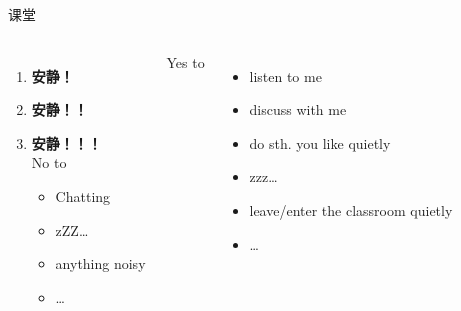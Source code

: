 \begin{frame}[<+->]{课堂}
	\linespread{1.2}
	\begin{columns}
		\begin{enumerate}
		  \item {\bf 安静！}
		  \item {\bf 安静！！}
		  \item {\bf 安静！！！}\\
		  \vspace{2em}
		  \pause
		  \alert{No to}
		  \begin{itemize}
		    \item Chatting
		    \item zZZ\ldots
		    \item anything noisy
		    \item \ldots
		  \end{itemize}
		\end{enumerate}
		\pause
		\alert{Yes to}
		  \begin{itemize}
		    \item listen to me
		    \item discuss with me
		    \item do sth. you like \alert{quietly}
		    \item zzz\ldots
		    \item leave/enter the classroom \alert{quietly}
		    \item \ldots
		  \end{itemize}
	\end{columns}
\end{frame}


